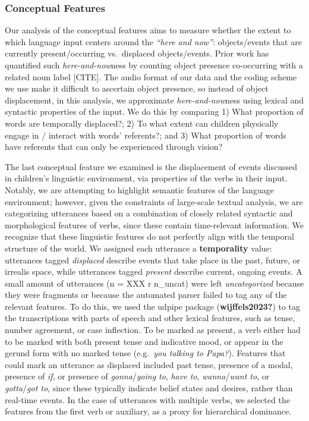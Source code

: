 \documentclass[
  man,floatsintext]{apa6}
\begin{document}
\hypertarget{conceptual-features}{%
\subsubsection{Conceptual Features}\label{conceptual-features}}

Our analysis of the conceptual features aims to measure whether the extent to which language input centers around the \emph{``here and now''}: objects/events that are currently present/occurring vs.~displaced objects/events. Prior work has quantified such \emph{here-and-now}ness by counting object presence co-occurring with a related noun label {[}CITE{]}. The audio format of our data and the coding scheme we use make it difficult to ascertain object presence, so instead of object displacement, in this analysis, we approximate \emph{here-and-now}ness using lexical and syntactic properties of the input. We do this by comparing 1) What proportion of words are temporally displaced?; 2) To what extent can children physically engage in / interact with words' referents?; and 3) What proportion of words have referents that can only be experienced through vision?

The last conceptual feature we examined is the displacement of events discussed in children's linguistic environment, via properties of the verbs in their input. Notably, we are attempting to highlight semantic features of the language environment; however, given the constraints of large-scale textual analysis, we are categorizing utterances based on a combination of closely related syntactic and morphological features of verbs, since these contain time-relevant information. We recognize that these linguistic features do not perfectly align with the temporal structure of the world. We assigned each utterance a \textbf{temporality} value: utterances tagged \emph{displaced} describe events that take place in the past, future, or irrealis space, while utterances tagged \emph{present} describe current, ongoing events. A small amount of utterances (n = XXX r n\_uncat) were left \emph{uncategorized} because they were fragments or because the automated parser failed to tag any of the relevant features. To do this, we used the udpipe package (\textbf{wijffels2023?}) to tag the transcriptions with parts of speech and other lexical features, such as tense, number agreement, or case inflection. To be marked as present, a verb either had to be marked with both present tense and indicative mood, or appear in the gerund form with no marked tense (e.g.~\emph{you talking to Papa?}). Features that could mark an utterance as displaced included past tense, presence of a modal, presence of \emph{if}, or presence of \emph{gonna}/\emph{going to}, \emph{have to}, \emph{wanna}/\emph{want to}, or \emph{gotta}/\emph{got to}, since these typically indicate belief states and desires, rather than real-time events. In the case of utterances with multiple verbs, we selected the features from the first verb or auxiliary, as a proxy for hierarchical dominance.
\end{document}
